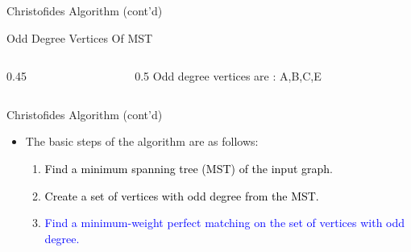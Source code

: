 \documentclass[12pt]{beamer}
\begin{document}
\begin{frame}{Christofides Algorithm (cont'd)}
    \begin{block}{Odd Degree Vertices Of MST}
    \begin{center}
    \begin{columns}
        \begin{column}{0.45\textwidth}
        \end{column}
        \begin{column}{0.5\textwidth}
        Odd degree vertices are : A,B,C,E
        \end{column}
    \end{columns}
    \end{center}
    \end{block}
\end{frame}
\begin{frame}{Christofides Algorithm (cont'd)}
    \begin{itemize}
        \item The basic steps of the algorithm are as follows:
        \begin{enumerate}
          \item \textcolor{black}{Find a minimum spanning tree (MST) of the input graph}.
         \item \textcolor{black}{Create a set of vertices with odd degree from the MST.}
         \item \textcolor{blue}{Find a minimum-weight perfect matching on the set of vertices with odd degree.}
        \end{enumerate}
    \end{itemize}
\end{frame}
\end{document}
